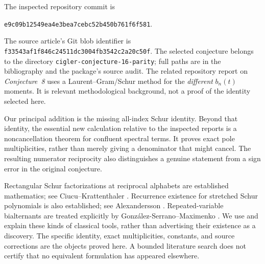 \documentclass[11pt]{article}
\theoremstyle{definition}
\theoremstyle{remark}
\newcommand{\pin}{e9c09b12549ea4e3bea7cebc52b450b761f6f581}
\theoremstyle{definition}
\theoremstyle{plain}
\numberwithin{equation}{section}
\begin{document}
The inspected repository commit is
\begin{center}\small\texttt{\pin}.\end{center}
The source article's Git blob identifier is
\texttt{f33543af1f846c24511dc3004fb3542c2a20c50f}.
The selected conjecture belongs to the directory
\texttt{cigler-conjecture-16-parity}; full paths are in the bibliography
and the package's source audit. The related repository report on
\emph{Conjecture~8} \cite{RepoEight} uses a Laurent--Gram/Schur method for the
\emph{different} $b_n(t)$ moments. It is relevant methodological background,
not a proof of the identity selected here.



Our principal addition is the missing all-index Schur identity. Beyond that
identity, the essential new calculation relative to the inspected reports
is a noncancellation theorem for confluent spectral terms. It proves exact
pole multiplicities, rather than merely giving a denominator that might
cancel. The resulting numerator reciprocity also distinguishes a genuine
statement from a sign error in the original conjecture.

Rectangular Schur factorizations at reciprocal alphabets are established
mathematics; see Ciucu--Krattenthaler \cite{CiucuK}. Recurrence existence for
stretched Schur polynomials is also established; see Alexandersson
\cite{Alexandersson}. Repeated-variable bialternants are treated explicitly
by Gonz\'alez-Serrano--Maximenko \cite{GSM}. We use and explain these kinds of
classical tools, rather than advertising their existence as a discovery.
The specific identity, exact multiplicities, constants, and source corrections
are the objects proved here. A bounded literature search does not certify
that no equivalent formulation has appeared elsewhere.
\end{document}
